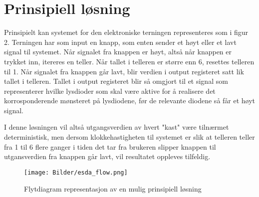 \section{Prinsipiell løsning}
\label{prinsipiellLoesning}

Prinsipielt kan systemet for den elektroniske terningen representeres som i figur 2. Terningen har som input en knapp, som enten sender et høyt eller 
et lavt signal til systemet. Når signalet fra knappen er høyt, altså når knappen er trykket inn, itereres en teller. Når tallet i telleren er større 
enn 6, resettes telleren til 1. Når signalet fra knappen går lavt, blir verdien i output registeret satt lik tallet i telleren. Tallet i output 
registeret blir så omgjort til et signal som representerer hvilke lysdioder som skal være aktive for å realisere det korrosponderende mønsteret på 
lysdiodene, før de relevante diodene så får et høyt signal.

I denne løsningen vil altså utgangsverdien av hvert "kast" være tilnærmet deterministisk, men dersom klokkehastigheten til systemet er slik at telleren 
teller fra 1 til 6 flere ganger i tiden det tar fra brukeren slipper knappen til utgansverdien fra knappen går lavt, vil resultatet oppleves tilfeldig.

\begin{figure}[H]
    \centering
    \texttt{[image: Bilder/esda\_flow.png]}
    \caption{Flytdiagram representasjon av en mulig prinsipiell løsning}
\end{figure}

